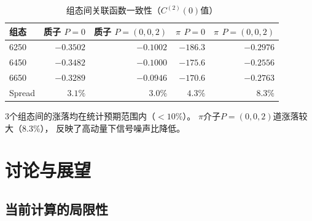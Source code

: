 \documentclass[11pt,a4paper]{article}
\begin{document}
\begin{table}[htbp]
\centering
\caption{组态间关联函数一致性（$C^{(2)}(0)$值）}
\label{tab:config_consistency}
\begin{tabular}{lrrrr}
\toprule
组态 & 质子 $P=0$ & 质子 $P=(0,0,2)$ & $\pi$ $P=0$ & $\pi$ $P=(0,0,2)$ \\
\midrule
6250 & $-0.3502$ & $-0.1002$ & $-186.3$ & $-0.2976$ \\
6450 & $-0.3482$ & $-0.1000$ & $-175.6$ & $-0.2556$ \\
6650 & $-0.3289$ & $-0.0946$ & $-170.6$ & $-0.2763$ \\
\midrule
Spread & $3.1\%$ & $3.0\%$ & $4.3\%$ & $8.3\%$ \\
\bottomrule
\end{tabular}
\end{table}

3个组态间的涨落均在统计预期范围内（$<10\%$）。
$\pi$介子$P=(0,0,2)$道涨落较大（8.3\%），
反映了高动量下信号噪声比降低。

\section{讨论与展望}

\subsection{当前计算的局限性}
\end{document}
